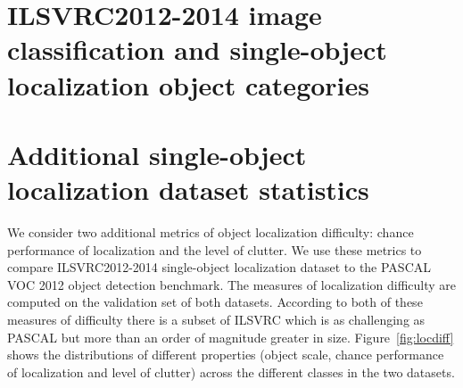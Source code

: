 \begin{appendices}



\section{ILSVRC2012-2014 image classification and single-object localization object categories}
\label{app:classes}

{\tiny


}

%



\section{Additional single-object localization dataset statistics}
\label{app:ICCV}

We consider two additional metrics of object localization difficulty: chance performance of localization and the level of clutter. We use these metrics to compare ILSVRC2012-2014
single-object localization dataset to the PASCAL VOC 2012 object detection benchmark. The measures of localization difficulty are computed on the validation set of both datasets. According to both of these measures of difficulty there is a subset of ILSVRC which is as challenging as PASCAL but more than an order of magnitude greater in size. Figure~\ref{fig:locdiff} shows the distributions of different properties (object scale, chance performance of localization and level of clutter) across the different classes in the two datasets.


\end{appendices}
